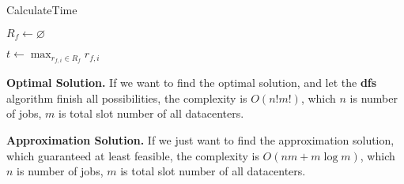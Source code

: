 \documentclass[12pt,a4paper]{article}
\begin{document}
\begin{minipage}[t]{1\textwidth}
	\begin{algorithm}[H] \label{Alg_calctime}
		\caption{CalculateTime}
		\BlankLine

		$R_f \leftarrow \varnothing$


		$t \leftarrow \max_{r_{f,i} \in R_f} r_{f,i}$

	\end{algorithm}
\end{minipage}

\textbf{Optimal Solution. } If we want to find the optimal solution,
and let the \textbf{dfs} algorithm finish all possibilities,
the complexity is $O(n!m!)$,
which $n$ is number of jobs, $m$ is total slot number of all datacenters.

\par
\textbf{Approximation Solution. } If we just want to find the approximation solution,
which guaranteed at least feasible,
the complexity is $O(nm + m \log m)$,
which $n$ is number of jobs, $m$ is total slot number of all datacenters.
\end{document}
